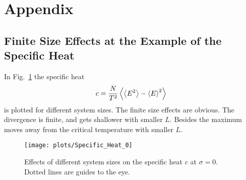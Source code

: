 \section{Appendix}
\subsection{Finite Size Effects at the Example of the Specific Heat}
\label{appendix:finiteSizeEffects}
    In Fig.\ \ref{fig:smeared_out_appendix} the specific heat
    \begin{equation}
        c = \frac{N}{T^2}\left< \left< E^2 \right> - \left< E \right>^2 \right>
    \end{equation}
    is plotted for different system sizes. The finite size effects are obvious.
    The divergence is finite, and gets shallower with smaller \(L\). Besides
    the maximum moves away from the critical temperature with smaller \(L\).
    \begin{figure}[htbp]
        \centering
        \texttt{[image: plots/Specific\_Heat\_0]}
        \caption[Finite Size Effects by Example of the Specific Heat]
        {
            Effects of different system sizes on the specific heat \(c\)
            at \(\sigma = 0\). Dotted lines are guides to the eye.
        }
        \label{fig:smeared_out_appendix}
    \end{figure}


